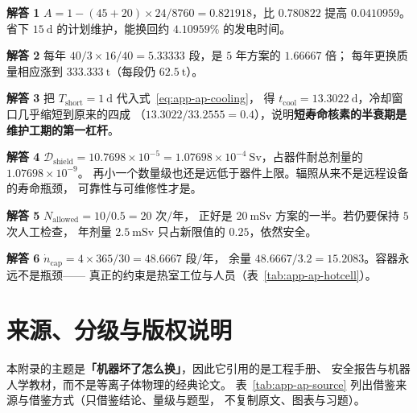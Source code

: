 \textbf{解答 1} $A = 1 - (45+20)\times24/8760 = 0.821918$，比 $0.780822$ 提高
$0.0410959$。省下 $15\ \mathrm{d}$ 的计划维护，能换回约 $4.10959\%$ 的发电时间。

\textbf{解答 2} 每年 $40/3 \times 16/40 = 5.33333$ 段，是 $5$ 年方案的 $1.66667$ 倍；
每年更换质量相应涨到 $333.333\ \mathrm{t}$（每段仍 $62.5\ \mathrm{t}$）。

\textbf{解答 3} 把 $T_{\text{short}} = 1\ \mathrm{d}$ 代入式~\eqref{eq:app-ap-cooling}，
得 $t_{\text{cool}} = 13.3022\ \mathrm{d}$，冷却窗口几乎缩短到原来的四成
（$13.3022/33.2555 = 0.4$），说明\textbf{短寿命核素的半衰期是维护工期的第一杠杆}。

\textbf{解答 4} $\mathcal{D}_{\text{shield}} = 10.7698 \times 10^{-5}
= 1.07698\times10^{-4}\ \mathrm{Sv}$，占器件耐总剂量的 $1.07698\times10^{-9}$。
再小一个数量级也还是远低于器件上限。辐照从来不是远程设备的寿命瓶颈，
可靠性与可维修性才是。

\textbf{解答 5} $N_{\text{allowed}} = 10/0.5 = 20$ 次$/$年，
正好是 $20\ \mathrm{mSv}$ 方案的一半。若仍要保持 $5$ 次人工检查，
年剂量 $2.5\ \mathrm{mSv}$ 只占新限值的 $0.25$，依然安全。

\textbf{解答 6} $\dot n_{\text{cap}} = 4 \times 365/30 = 48.6667$ 段$/$年，
余量 $48.6667/3.2 = 15.2083$。容器永远不是瓶颈——
真正的约束是热室工位与人员（表~\ref{tab:app-ap-hotcell}）。

\section{来源、分级与版权说明}
\label{sec:app-ap-source}

\begingroup\small
本附录的主题是\textbf{「机器坏了怎么换」}，因此它引用的是工程手册、
安全报告与机器人学教材，而不是等离子体物理的经典论文。
表~\ref{tab:app-ap-source} 列出借鉴来源与借鉴方式（只借鉴结论、量级与题型，
不复制原文、图表与习题）。

